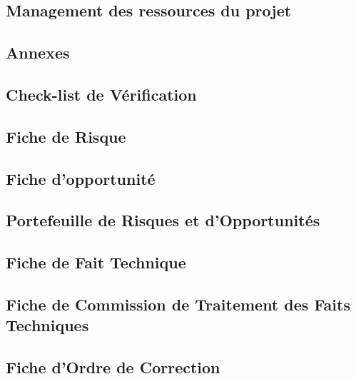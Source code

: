 \documentclass[asi]{picInsa}
\begin{document}
\chapter{Management des ressources du projet}
\label{ressources}

 
\begin{appendix}
\part*{Annexes}

\chapter{Check-list de Vérification}
\label{annexeCheckList}



\chapter{Fiche de Risque}
\label{annexeFRi}


\chapter{Fiche d'opportunité}
\label{annexeFO}


\chapter{Portefeuille de Risques et d'Opportunités}


\chapter{Fiche de Fait Technique}
\label{annexeFFT}


\chapter{Fiche de Commission de Traitement des Faits Techniques}
\label{annexeFCTFT}


\chapter{Fiche d'Ordre de Correction}
\label{annexeFOC}



\end{appendix}
\end{document}
